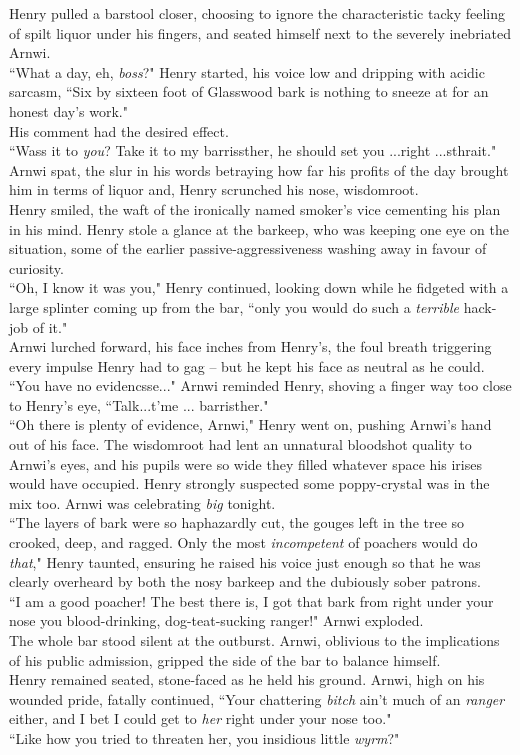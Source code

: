 Henry pulled a barstool closer, choosing to ignore the characteristic tacky feeling of spilt liquor under his fingers, and seated himself next to the severely inebriated Arnwi.\\
``What a day, eh, \textit{boss}?" Henry started, his voice low and dripping with acidic sarcasm, ``Six by sixteen foot of Glasswood bark is nothing to sneeze at for an honest day's work."\\
His comment had the desired effect.\\
``Wass it to \textit{you}? Take it to my barrissther, he should set you ...right ...sthrait." Arnwi spat, the slur in his words betraying how far his profits of the day brought him in terms of liquor and, Henry scrunched his nose, wisdomroot.\\
Henry smiled, the waft of the ironically named smoker's vice cementing his plan in his mind. 
Henry stole a glance at the barkeep, who was keeping one eye on the situation, some of the earlier passive-aggressiveness washing away in favour of curiosity.\\

``Oh, I know it was you," Henry continued, looking down while he fidgeted with a large splinter coming up from the bar, ``only you would do such a \textit{terrible} hack-job of it."\\
Arnwi lurched forward, his face inches from Henry's, the foul breath triggering every impulse Henry had to gag -- but he kept his face as neutral as he could.
``You have no evidencsse..." Arnwi reminded Henry, shoving a finger way too close to Henry's eye, ``Talk...t'me ... barristher."\\
``Oh there is plenty of evidence, Arnwi," Henry went on, pushing Arnwi's hand out of his face.
The wisdomroot had lent an unnatural bloodshot quality to Arnwi's eyes, and his pupils were so wide they filled whatever space his irises would have occupied.
Henry strongly suspected some poppy-crystal was in the mix too.
Arnwi was celebrating \textit{big} tonight.\\
``The layers of bark were so haphazardly cut, the gouges left in the tree so crooked, deep, and ragged. Only the most \textit{incompetent} of poachers would do \textit{that}," Henry taunted, ensuring he raised his voice just enough so that he was clearly overheard by both the nosy barkeep and the dubiously sober patrons.\\

``I am a good poacher! The best there is, I got that bark from right under your nose you blood-drinking, dog-teat-sucking ranger!" Arnwi exploded.\\
The whole bar stood silent at the outburst.
Arnwi, oblivious to the implications of his public admission, gripped the side of the bar to balance himself.\\
Henry remained seated, stone-faced as he held his ground.
Arnwi, high on his wounded pride, fatally continued, ``Your chattering \textit{bitch} ain't much of an \textit{ranger} either, and I bet I could get to \textit{her} right under your nose too."\\
``Like how you tried to threaten her, you insidious little \textit{wyrm}?"\\

